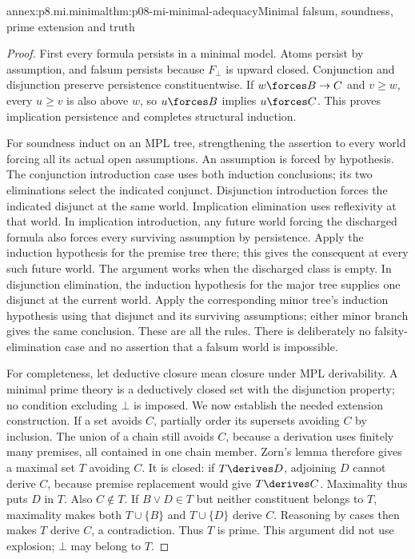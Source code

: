 \begin{annexitem}{annex:p8.mi.minimal}{thm:p08-mi-minimal-adequacy}{Minimal falsum, soundness, prime extension and truth}
\begin{proof}
First every formula persists in a minimal model. Atoms persist by
assumption, and falsum persists because \(F_{\bot}\) is upward closed.
Conjunction and disjunction preserve persistence constituentwise. If
\(w\forces B\to C\) and \(v\geq w\), every \(u\geq v\) is also
above \(w\), so \(u\forces B\) implies \(u\forces C\).
This proves implication persistence and completes structural induction.

For soundness induct on an MPL tree, strengthening the assertion to
every world forcing all its actual open assumptions. An assumption is
forced by hypothesis. The conjunction introduction case uses both
induction conclusions; its two eliminations select the indicated
conjunct. Disjunction introduction forces the indicated disjunct at the
same world. Implication elimination uses reflexivity at that world.
In implication introduction, any future world forcing the discharged
formula also forces every surviving assumption by persistence. Apply
the induction hypothesis for the premise tree there; this gives the
consequent at every such future world. The argument works when the
discharged class is empty. In disjunction elimination, the induction
hypothesis for the major tree supplies one disjunct at the current world.
Apply the corresponding minor tree's induction hypothesis using that
disjunct and its surviving assumptions; either minor branch gives the
same conclusion. These are all the rules. There is deliberately no
falsity-elimination case and no assertion that a falsum world is impossible.

For completeness, let deductive closure mean closure under MPL
derivability. A minimal prime theory is a deductively closed set with
the disjunction property; no condition excluding \(\bot\) is imposed.
We now establish the needed extension construction. If a set avoids
\(C\), partially order its supersets avoiding \(C\) by inclusion.
The union of a chain still avoids \(C\), because a derivation uses
finitely many premises, all contained in one chain member. Zorn's lemma
therefore gives a maximal set \(T\) avoiding \(C\).
It is closed: if \(T\derives D\), adjoining \(D\) cannot derive
\(C\), because premise replacement would give \(T\derives C\).
Maximality thus puts \(D\) in \(T\). Also \(C\notin T\).
If \(B\lor D\in T\) but neither constituent belongs to \(T\),
maximality makes both \(T\cup\{B\}\) and \(T\cup\{D\}\) derive
\(C\). Reasoning by cases then makes \(T\) derive \(C\), a
contradiction. Thus \(T\) is prime. This argument did not use
explosion; \(\bot\) may belong to \(T\).


\end{proof}
\end{annexitem}
